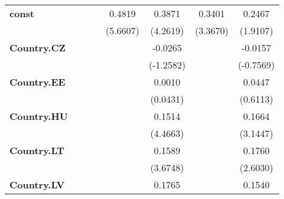 \documentclass{article}
\begin{document}
\begin{table}[!htbp]
\begin{center}
{\begin{tabular}{lccccccc}
\textbf{const}                   &                              &                                &                  &       0.4819      &        0.3871        &       0.3401      &       0.2467       \\
\textbf{ }                       &                              &                                &                  &      (5.6607)     &       (4.2619)       &      (3.3670)     &      (1.9107)      \\
\textbf{Country.CZ}              &                              &                                &                  &                   &       -0.0265        &                   &      -0.0157       \\
\textbf{ }                       &                              &                                &                  &                   &      (-1.2582)       &                   &     (-0.7569)      \\
\textbf{Country.EE}              &                              &                                &                  &                   &        0.0010        &                   &       0.0447       \\
\textbf{ }                       &                              &                                &                  &                   &       (0.0431)       &                   &      (0.6113)      \\
\textbf{Country.HU}              &                              &                                &                  &                   &        0.1514        &                   &       0.1664       \\
\textbf{ }                       &                              &                                &                  &                   &       (4.4663)       &                   &      (3.1447)      \\
\textbf{Country.LT}              &                              &                                &                  &                   &        0.1589        &                   &       0.1760       \\
\textbf{ }                       &                              &                                &                  &                   &       (3.6748)       &                   &      (2.6030)      \\
\textbf{Country.LV}              &                              &                                &                  &                   &        0.1765        &                   &       0.1540       \\

\end{tabular}}
\end{center}
\end{table}
\end{document}
